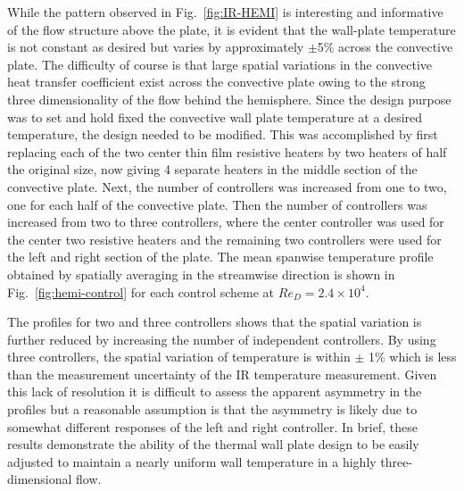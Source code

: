 While the pattern observed in Fig.~\ref{fig:IR-HEMI} is interesting and informative of the flow structure above the plate, it is evident that the wall-plate temperature is not constant as desired but varies by approximately $\pm$5\% across the convective plate. The difficulty of course is that large spatial variations in the convective heat transfer coefficient exist across the convective plate owing to the strong three dimensionality of the flow behind the hemisphere. Since the design purpose was to set and hold fixed the convective wall plate temperature at a desired temperature, the design needed to be modified. This was accomplished by first replacing each of the two center thin film resistive heaters by two heaters of half the original size, now giving 4 separate heaters in the middle section of the convective plate. Next, the number of controllers was increased from one to two, one for each half of the convective plate. Then the number of controllers was increased from two to three controllers, where the center controller was used for the center two resistive heaters and the remaining two controllers were used for the left and right section of the plate. The mean spanwise temperature profile obtained by spatially averaging in the streamwise direction is shown in Fig.~\ref{fig:hemi-control}  for each control scheme at $Re_D = 2.4 \times 10^4$. 

The profiles for two and three controllers shows that the spatial variation is further reduced by increasing the number of independent controllers. By using three controllers, the spatial variation of temperature is within $\pm$ 1\% which is less than the measurement uncertainty of the IR temperature measurement. Given this lack of resolution it is difficult to assess the apparent asymmetry in the profiles but a reasonable assumption is that the asymmetry is likely due to somewhat different responses of the left and right controller. In brief, these results demonstrate the ability of the thermal wall plate design to be easily adjusted to maintain a nearly uniform wall temperature in a highly three-dimensional flow.


